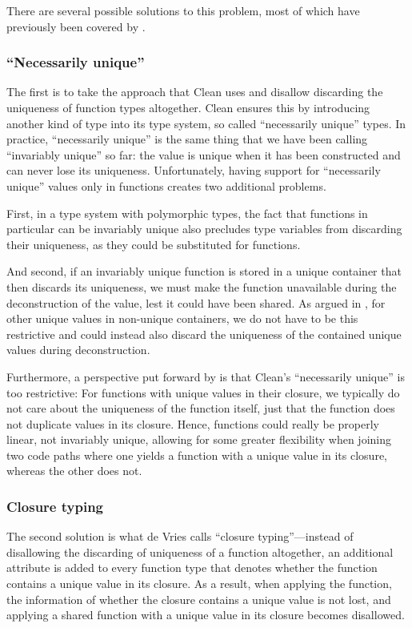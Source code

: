There are several possible solutions to this problem, most of which have previously been covered by \cite{de_vries_making_2009}. 

\subsubsection{``Necessarily unique''}
The first is to take the approach that Clean uses and disallow discarding the uniqueness of function types altogether. Clean ensures this by introducing another kind of type into its type system, so called ``necessarily unique'' types. In practice, ``necessarily unique'' is the same thing that we have been calling ``invariably unique'' so far: the value is unique when it has been constructed and can never lose its uniqueness. Unfortunately, having support for ``necessarily unique'' values only in functions creates two additional problems.

First, in a type system with polymorphic types, the fact that functions in particular can be invariably unique also precludes type variables from discarding their uniqueness, as they could be substituted for functions.

And second, if an invariably unique function is stored in a unique container that then discards its uniqueness, we must make the function unavailable during the deconstruction of the value, lest it could have been shared. As argued in , for other unique values in non-unique containers, we do not have to be this restrictive and could instead also discard the uniqueness of the contained unique values during deconstruction.

Furthermore, a perspective put forward by \cite{sergey_linearity_2022} is that Clean's ``necessarily unique'' is too restrictive: For functions with unique values in their closure, we typically do not care about the uniqueness of the function itself, just that the function does not duplicate values in its closure. Hence, functions could really be properly linear, not invariably unique, allowing for some greater flexibility when joining two code paths where one yields a function with a unique value in its closure, whereas the other does not.

\subsubsection{Closure typing}
The second solution is what de Vries calls ``closure typing''---instead of disallowing the discarding of uniqueness of a function altogether, an additional attribute is added to every function type that denotes whether the function contains a unique value in its closure. As a result, when applying the function, the information of whether the closure contains a unique value is not lost, and applying a shared function with a unique value in its closure becomes disallowed.


